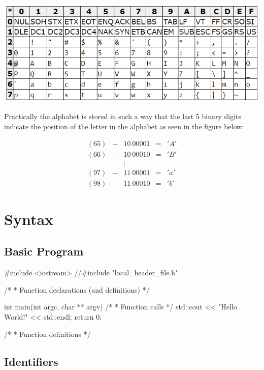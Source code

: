 \documentclass[10pt,a4paper]{scrartcl}
\begin{document}
\begin{multicols*}{2}
\includegraphics[width=\linewidth]{Pictures/ASCII}

Practically the alphabet is stored in such a way that the last 5 binary digits indicate the position of the letter in the alphabet as seen in the figure below:

\begin{center}
\begin{align*}
(65)&-&10\ 00001&=&'A'\\
(66)&-&10\ 00010&=&'B'\\
&&\vdots&&\\
(97)&-&11\ 00001&=&'a'\\
(98)&-&11\ 00010&=&'b'
\end{align*}
\end{center}



\section{Syntax}
\label{sec:Syntax}

\subsection{Basic Program}
\label{sec:BasicProgram}

\begin{TPCpp}
#include <iostream>
//#include "local_header_file.h"

/*
 * Function declarations (and definitions)
 */

int main(int argc, char ** argv)
{
	  /*
	   * Function calls
	   */
    std::cout << "Hello World!" << std::endl;
    return 0;
}

/*
 * Function definitions
 */
\end{TPCpp}

\subsection{Identifiers}
\label{sec:Identifiers}


\end{multicols*}
\end{document}

